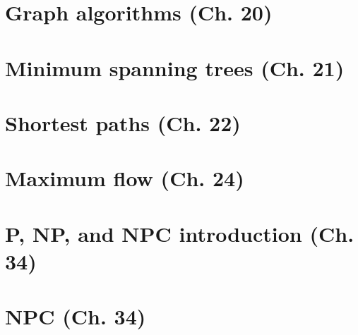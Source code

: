 \documentclass{article}
\begin{document}
\section{Graph algorithms (Ch. 20)}


\section{Minimum spanning trees (Ch. 21)}


\section{Shortest paths (Ch. 22)}


\section{Maximum flow (Ch. 24)}


\section{P, NP, and NPC introduction (Ch. 34)}


\section{NPC (Ch. 34)} 

\end{document}
